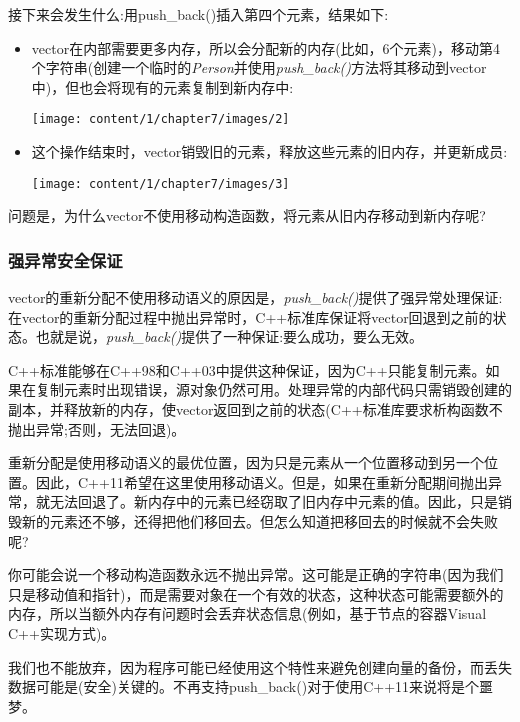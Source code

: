 接下来会发生什么:用push_back()插入第四个元素，结果如下:

\begin{itemize}
	\item vector在内部需要更多内存，所以会分配新的内存(比如，6个元素)，移动第4个字符串(创建一个临时的\textit{Person}并使用\textit{push_back()}方法将其移动到vector中)，但也会将现有的元素复制到新内存中:
\begin{center}
		\texttt{[image: content/1/chapter7/images/2]}
	\end{center}
	\item 这个操作结束时，vector销毁旧的元素，释放这些元素的旧内存，并更新成员:
\begin{center}
		\texttt{[image: content/1/chapter7/images/3]}
	\end{center}
\end{itemize}

问题是，为什么vector不使用移动构造函数，将元素从旧内存移动到新内存呢?

\subsubsection{强异常安全保证}

vector的重新分配不使用移动语义的原因是，\textit{push_back()}提供了强异常处理保证:在vector的重新分配过程中抛出异常时，C++标准库保证将vector回退到之前的状态。也就是说，\textit{push_back()}提供了一种保证:要么成功，要么无效。

C++标准能够在C++98和C++03中提供这种保证，因为C++只能复制元素。如果在复制元素时出现错误，源对象仍然可用。处理异常的内部代码只需销毁创建的副本，并释放新的内存，使vector返回到之前的状态(C++标准库要求析构函数不抛出异常;否则，无法回退)。

重新分配是使用移动语义的最优位置，因为只是元素从一个位置移动到另一个位置。因此，C++11希望在这里使用移动语义。但是，如果在重新分配期间抛出异常，就无法回退了。新内存中的元素已经窃取了旧内存中元素的值。因此，只是销毁新的元素还不够，还得把他们移回去。但怎么知道把移回去的时候就不会失败呢?

你可能会说一个移动构造函数永远不抛出异常。这可能是正确的字符串(因为我们只是移动值和指针)，而是需要对象在一个有效的状态，这种状态可能需要额外的内存，所以当额外内存有问题时会丢弃状态信息(例如，基于节点的容器Visual C++实现方式)。

我们也不能放弃，因为程序可能已经使用这个特性来避免创建向量的备份，而丢失数据可能是(安全)关键的。不再支持push_back()对于使用C++11来说将是个噩梦。

